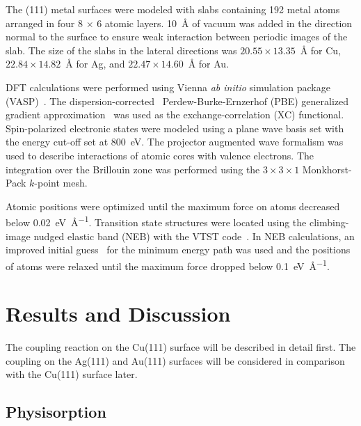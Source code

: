 \documentclass[aps,prb,reprint,amsmath,amssymb]{revtex4-1}
\newcommand{\lock}{\color{red}}
\newcommand{\lock}{\color{black}}
\newcommand{\comm}{\color{green}} %
\begin{document}
{\lock

The (111) metal surfaces were modeled with slabs containing 192 metal atoms arranged in four 8 $\times$ 6 atomic layers. \SI{10}{\angstrom} of vacuum was added in the direction normal to the surface to ensure weak interaction between periodic images of the slab. The size of the slabs in the lateral directions was $20.55 \times 13.35$~\si{\angstrom} for Cu, $22.84 \times 14.82$~\si{\angstrom} for Ag, and $22.47 \times 14.60$~\si{\angstrom} for Au.

DFT calculations were performed using Vienna \emph{ab initio} simulation package (VASP)~\cite{ullmann_131, ullmann_132, ullmann_133, ullmann_134}. The dispersion-corrected~\cite{ullmann_136, ullmann_137} Perdew-Burke-Ernzerhof (PBE) generalized gradient approximation~\cite{ullmann_139} was used as the exchange-correlation (XC) functional. 
Spin-polarized electronic states were modeled using a plane wave basis set with the energy cut-off set at \SI{800}{\electronvolt}.
The projector augmented wave formalism was used to describe interactions of atomic cores with valence electrons. The integration over the Brillouin zone was performed using the $3\times 3 \times1$ Monkhorst-Pack $k$-point mesh. 

Atomic positions were optimized until the maximum force on atoms decreased below \SI{0.02}{\electronvolt\per\angstrom}. 
Transition state structures were located using the climbing-image nudged elastic band (NEB) with the VTST code~\cite{ullmann_59}. 
In NEB calculations, an improved initial guess~\cite{ullmann_60, ullmann_99} for the minimum energy path was used and the positions of atoms were relaxed until the maximum force dropped below \SI{0.1}{\electronvolt\per\angstrom}.


}

\section{Results and Discussion}

The coupling reaction on the Cu(111) surface will be described in detail first. The coupling on the Ag(111) and Au(111) surfaces will be considered in comparison with the Cu(111) surface later.


\ifdefined\INTERNAL
\subsection{Physisorption}
\fi
\end{document}
